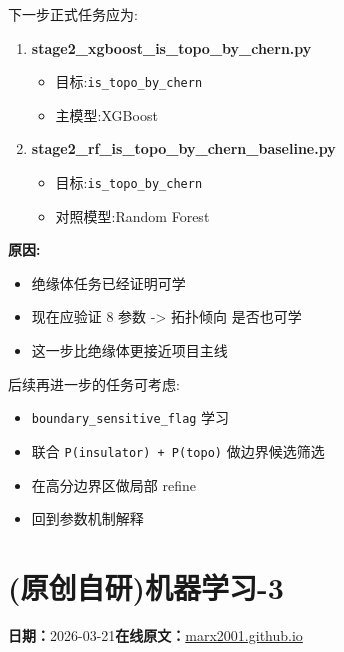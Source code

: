 \documentclass[lang=cn,scheme=chinese,color=blue,device=normal,toc=onecol,math=cm]{elegantbook}
\begin{document}
下一步正式任务应为:\par


\begin{enumerate}
\item \textbf{stage2\_\allowbreak{}xgboost\_\allowbreak{}is\_\allowbreak{}topo\_\allowbreak{}by\_\allowbreak{}chern.py}\par
 
\begin{itemize}
\item 目标:\texttt{is\_\allowbreak{}topo\_\allowbreak{}by\_\allowbreak{}chern}
\item 主模型:XGBoost
\end{itemize}
\item \textbf{stage2\_\allowbreak{}rf\_\allowbreak{}is\_\allowbreak{}topo\_\allowbreak{}by\_\allowbreak{}chern\_\allowbreak{}baseline.py}\par
 
\begin{itemize}
\item 目标:\texttt{is\_\allowbreak{}topo\_\allowbreak{}by\_\allowbreak{}chern}
\item 对照模型:Random Forest
\end{itemize}
\end{enumerate}


\textbf{原因:}\par


\begin{itemize}
\item 绝缘体任务已经证明可学
\item 现在应验证 8 参数 -> 拓扑倾向 是否也可学
\item 这一步比绝缘体更接近项目主线
\end{itemize}


后续再进一步的任务可考虑:\par


\begin{itemize}
\item \texttt{boundary\_\allowbreak{}sensitive\_\allowbreak{}flag} 学习
\item 联合 \texttt{P(insulator) + P(topo)} 做边界候选筛选
\item 在高分边界区做局部 refine
\item 回到参数机制解释
\end{itemize}



\section{(原创自研)机器学习-3}
\begin{articlemeta}
\textbf{日期：}2026-03-21\hfill\textbf{在线原文：}\href{https://marx2001.github.io/sci-note\_posts/20260321-ML3}{marx2001.github.io}
\end{articlemeta}
\end{document}
